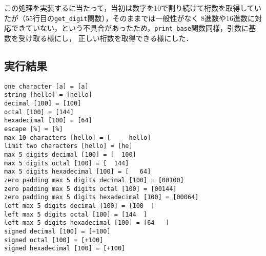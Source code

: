 \documentclass[a4j,11pt]{jarticle}
\begin{document}
この処理を実装するに当たって，当初は数字を10で割り続けて桁数を取得していたが（55行目の{{\tt get\_digit}}関数），そのままでは一般性がなく
8進数や16進数に対応できていない，という不具合があったため，{{\tt print\_base}}関数同様，引数に基数を受け取る様にし，
正しい桁数を取得できる様にした．

\subsection{実行結果}
\begin{verbatim}
one character [a] = [a]
string [hello] = [hello]
decimal [100] = [100]
octal [100] = [144]
hexadecimal [100] = [64]
escape [%] = [%]
max 10 characters [hello] = [     hello]
limit two characters [hello] = [he]
max 5 digits decimal [100] = [  100]
max 5 digits octal [100] = [  144]
max 5 digits hexadecimal [100] = [   64]
zero padding max 5 digits decimal [100] = [00100]
zero padding max 5 digits octal [100] = [00144]
zero padding max 5 digits hexadecimal [100] = [00064]
left max 5 digits decimal [100] = [100  ]
left max 5 digits octal [100] = [144  ]
left max 5 digits hexadecimal [100] = [64   ]
signed decimal [100] = [+100]
signed octal [100] = [+100]
signed hexadecimal [100] = [+100]
\end{verbatim}
\end{document}

